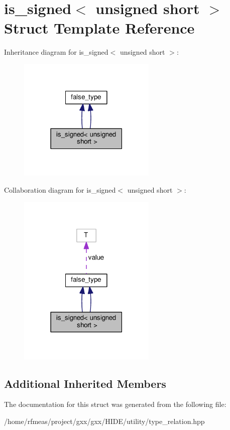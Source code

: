 \hypertarget{structis__signed_3_01unsigned_01short_01_4}{}\section{is\+\_\+signed$<$ unsigned short $>$ Struct Template Reference}
\label{structis__signed_3_01unsigned_01short_01_4}


Inheritance diagram for is\+\_\+signed$<$ unsigned short $>$\+:
\nopagebreak
\begin{figure}[H]
\begin{center}
\leavevmode
\includegraphics[width=186pt]{structis__signed_3_01unsigned_01short_01_4__inherit__graph}
\end{center}
\end{figure}


Collaboration diagram for is\+\_\+signed$<$ unsigned short $>$\+:
\nopagebreak
\begin{figure}[H]
\begin{center}
\leavevmode
\includegraphics[width=186pt]{structis__signed_3_01unsigned_01short_01_4__coll__graph}
\end{center}
\end{figure}
\subsection*{Additional Inherited Members}


The documentation for this struct was generated from the following file\+:\begin{DoxyCompactItemize}
\item 
/home/rfmeas/project/gxx/gxx/\+H\+I\+D\+E/utility/type\+\_\+relation.\+hpp\end{DoxyCompactItemize}
